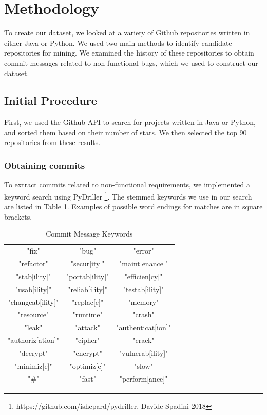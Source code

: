 \documentclass[sigconf]{acmart}
\begin{document}
\section{Methodology}
To create our dataset, we looked at a variety of Github repositories written in either Java or Python. 
We used two main methods to identify candidate repositories for mining. We examined the history of these repositories to obtain commit messages related to non-functional bugs, which we used to construct our dataset.
 
\subsection{Initial Procedure}
First, we used the Github API to search for projects written in Java or Python, and sorted them based on their number of stars. We then selected the top 90 repositories from these results. 

\subsubsection{Obtaining commits}
To extract commits related to non-functional requirements, we implemented a keyword search using PyDriller \footnote{https://github.com/ishepard/pydriller, Davide Spadini 2018}. The stemmed keywords we use in our search are listed in Table \ref{tab:kwds}. Examples of possible word endings for matches are in square brackets.

\begin{table}
  \caption{Commit Message Keywords}
  \label{tab:kwds}
\begin{tabular}{ c c c }
  \toprule
   "fix"             &"bug"           &"error"\\
   "refactor"	     &"secur[ity]"    &"maint[enance]"\\
   "stab[ility]"     &"portab[ility]" &"efficien[cy]"\\
   "usab[ility]"     &"reliab[ility]" &"testab[ility]"\\
   "changeab[ility]" &"replac[e]"     &"memory"\\
   "resource"        &"runtime"       &"crash"\\
   "leak"            &"attack"        &"authenticat[ion]"\\
   "authoriz[ation]" &"cipher"        &"crack" \\ 
   "decrypt"         &"encrypt"       &"vulnerab[ility]"\\ 
   "minimiz[e]"      &"optimiz[e]"    &"slow"\\
   "\#"              &"fast"          &"perform[ance]"\\
  \bottomrule
\end{tabular}
\end{table}
\end{document}
